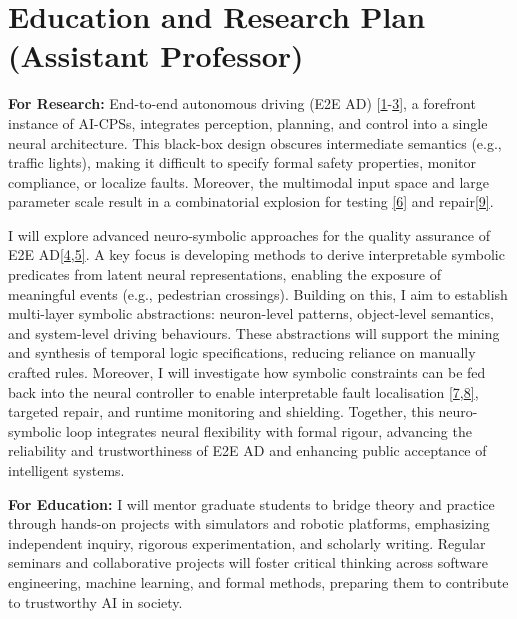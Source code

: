 \documentclass[11pt,a4paper]{moderncv}        %
\renewcommand{\headrulewidth}{0.4pt}       %
\begin{document}
\clearpage
\fancyhf{}
\renewcommand{\headrulewidth}{0.4pt}       %
\fancyhead[R]{\textcolor{gray}{\thepage}}        %

\section{Education and Research Plan (Assistant Professor)}


\textbf{For Research:} End-to-end autonomous driving (E2E AD) [\hyperlink{paper1}{1}-\hyperlink{paper3}{3}], a forefront instance of AI-CPSs, integrates perception, planning, and control into a single neural architecture. This black-box design obscures intermediate semantics (e.g., traffic lights), making it difficult to specify formal safety properties, monitor compliance, or localize faults. Moreover, the multimodal input space and large parameter scale result in a combinatorial explosion for testing \hyperlink{paper6}{[6]} and repair\hyperlink{paper9}{[9]}.

I will explore advanced neuro-symbolic approaches for the quality assurance of E2E AD\hyperlink{paper4}{[4},\hyperlink{paper5}{5]}. A key focus is developing methods to derive interpretable symbolic predicates from latent neural representations, enabling the exposure of meaningful events (e.g., pedestrian crossings). Building on this, I aim to establish multi-layer symbolic abstractions: neuron-level patterns, object-level semantics, and system-level driving behaviours. These abstractions will support the mining and synthesis of temporal logic specifications, reducing reliance on manually crafted rules. Moreover, I will investigate how symbolic constraints can be fed back into the neural controller to enable interpretable fault localisation \hyperlink{paper7}{[7},\hyperlink{paper8}{8]}, targeted repair, and runtime monitoring and shielding. Together, this neuro-symbolic loop integrates neural flexibility with formal rigour, advancing the reliability and trustworthiness of E2E AD and enhancing public acceptance of intelligent systems.

\textbf{For Education:} I will mentor graduate students to bridge theory and practice through hands-on projects with simulators and robotic platforms, emphasizing independent inquiry, rigorous experimentation, and scholarly writing. Regular seminars and collaborative projects will foster critical thinking across software engineering, machine learning, and formal methods, preparing them to contribute to trustworthy AI in society.
\end{document}
